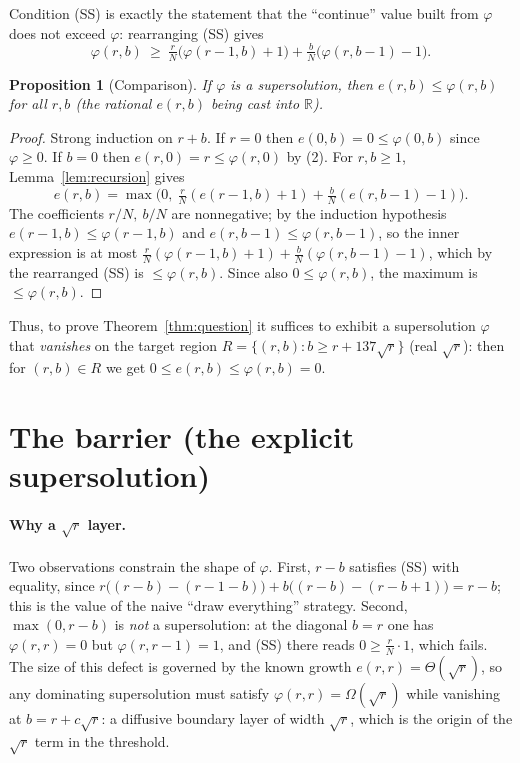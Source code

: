 \documentclass{article}
\newtheorem{proposition}[theorem]{Proposition}
\begin{document}
Condition (SS) is exactly the statement that the ``continue'' value built from
$\varphi$ does not exceed $\varphi$: rearranging (SS) gives
\[
  \varphi(r,b)\ \ge\ \tfrac{r}{N}\big(\varphi(r-1,b)+1\big)
                    +\tfrac{b}{N}\big(\varphi(r,b-1)-1\big).
\]

\begin{proposition}[Comparison]\label{prop:comparison}
\leanok
{}
If $\varphi$ is a supersolution, then $e(r,b)\le\varphi(r,b)$ for all $r,b$ (the
rational $e(r,b)$ being cast into $\mathbb R$).
\end{proposition}
\begin{proof}\leanok
Strong induction on $r+b$.
If $r=0$ then $e(0,b)=0\le\varphi(0,b)$ since $\varphi\ge0$.
If $b=0$ then $e(r,0)=r\le\varphi(r,0)$ by (2).
For $r,b\ge1$, Lemma~\ref{lem:recursion} gives
\[
  e(r,b)=\max\!\Big(0,\ \tfrac{r}{N}(e(r-1,b)+1)+\tfrac{b}{N}(e(r,b-1)-1)\Big).
\]
The coefficients $r/N,\ b/N$ are nonnegative; by the induction hypothesis
$e(r-1,b)\le\varphi(r-1,b)$ and $e(r,b-1)\le\varphi(r,b-1)$, so the inner expression
is at most $\tfrac{r}{N}(\varphi(r-1,b)+1)+\tfrac{b}{N}(\varphi(r,b-1)-1)$, which by
the rearranged (SS) is $\le\varphi(r,b)$. Since also $0\le\varphi(r,b)$, the maximum
is $\le\varphi(r,b)$.
\end{proof}

Thus, to prove Theorem~\ref{thm:question} it suffices to exhibit a supersolution
$\varphi$ that \emph{vanishes} on the target region
$R=\{(r,b): b\ge r+137\sqrt r\}$ (real $\sqrt r$): then for $(r,b)\in R$ we get
$0\le e(r,b)\le\varphi(r,b)=0$.

\section{The barrier (the explicit supersolution)}

\paragraph{Why a $\sqrt r$ layer.}
Two observations constrain the shape of $\varphi$. First, $r-b$ satisfies (SS) with
equality, since
$r\big((r-b)-(r-1-b)\big)+b\big((r-b)-(r-b+1)\big)=r-b$; this is the value of the
naive ``draw everything'' strategy. Second, $\max(0,r-b)$ is \emph{not} a
supersolution: at the diagonal $b=r$ one has $\varphi(r,r)=0$ but
$\varphi(r,r-1)=1$, and (SS) there reads $0\ge \tfrac{r}{N}\cdot 1$, which fails.
The size of this defect is governed by the known growth $e(r,r)=\Theta(\sqrt r)$,
so any dominating supersolution must satisfy $\varphi(r,r)=\Omega(\sqrt r)$ while
vanishing at $b=r+c\sqrt r$: a diffusive boundary layer of width $\sqrt r$, which is
the origin of the $\sqrt r$ term in the threshold.
\end{document}
